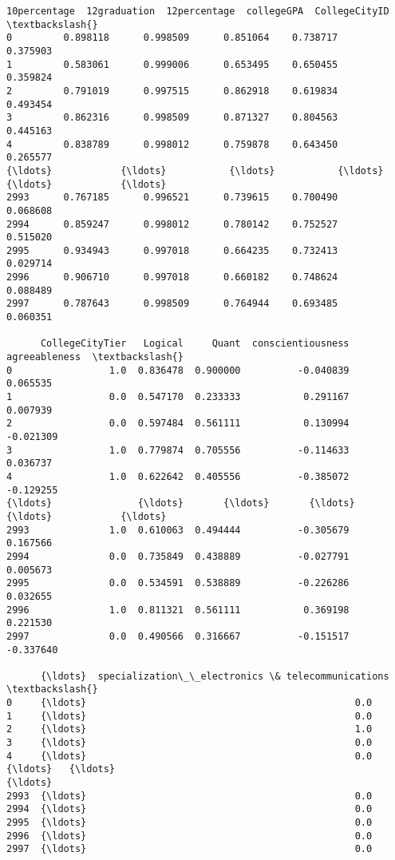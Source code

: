 \documentclass[11pt]{article}
\makeatletter
\newcommand{\boxspacing}{\kern\kvtcb@left@rule\kern\kvtcb@boxsep}
\newcommand{\prompt}[4]{
        {\ttfamily\llap{{\color{#2}[#3]:\hspace{3pt}#4}}\vspace{-\baselineskip}}
    }
\makeatother
\begin{document}
            \begin{tcolorbox}[breakable, size=fbox, boxrule=.5pt, pad at break*=1mm, opacityfill=0]
\prompt{Out}{outcolor}{38}{\boxspacing}
\begin{Verbatim}[commandchars=\\\{\}]
      10percentage  12graduation  12percentage  collegeGPA  CollegeCityID  \textbackslash{}
0         0.898118      0.998509      0.851064    0.738717       0.375903
1         0.583061      0.999006      0.653495    0.650455       0.359824
2         0.791019      0.997515      0.862918    0.619834       0.493454
3         0.862316      0.998509      0.871327    0.804563       0.445163
4         0.838789      0.998012      0.759878    0.643450       0.265577
{\ldots}            {\ldots}           {\ldots}           {\ldots}         {\ldots}            {\ldots}
2993      0.767185      0.996521      0.739615    0.700490       0.068608
2994      0.859247      0.998012      0.780142    0.752527       0.515020
2995      0.934943      0.997018      0.664235    0.732413       0.029714
2996      0.906710      0.997018      0.660182    0.748624       0.088489
2997      0.787643      0.998509      0.764944    0.693485       0.060351

      CollegeCityTier   Logical     Quant  conscientiousness  agreeableness  \textbackslash{}
0                 1.0  0.836478  0.900000          -0.040839       0.065535
1                 0.0  0.547170  0.233333           0.291167       0.007939
2                 0.0  0.597484  0.561111           0.130994      -0.021309
3                 1.0  0.779874  0.705556          -0.114633       0.036737
4                 1.0  0.622642  0.405556          -0.385072      -0.129255
{\ldots}               {\ldots}       {\ldots}       {\ldots}                {\ldots}            {\ldots}
2993              1.0  0.610063  0.494444          -0.305679       0.167566
2994              0.0  0.735849  0.438889          -0.027791       0.005673
2995              0.0  0.534591  0.538889          -0.226286       0.032655
2996              1.0  0.811321  0.561111           0.369198       0.221530
2997              0.0  0.490566  0.316667          -0.151517      -0.337640

      {\ldots}  specialization\_\_electronics \& telecommunications  \textbackslash{}
0     {\ldots}                                               0.0
1     {\ldots}                                               0.0
2     {\ldots}                                               1.0
3     {\ldots}                                               0.0
4     {\ldots}                                               0.0
{\ldots}   {\ldots}                                               {\ldots}
2993  {\ldots}                                               0.0
2994  {\ldots}                                               0.0
2995  {\ldots}                                               0.0
2996  {\ldots}                                               0.0
2997  {\ldots}                                               0.0


\end{Verbatim}
\end{tcolorbox}
\end{document}

